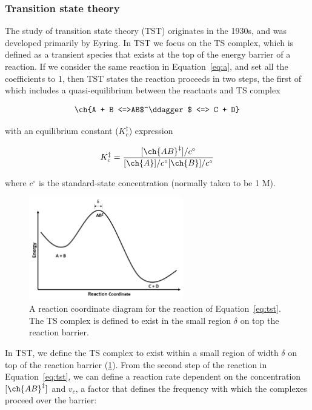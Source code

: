 \begin{doublespace}
\subsubsection{Transition state theory}

The study of transition state theory (TST) originates in the 1930s, and was
developed primarily by Eyring.\cite{McQuarrie1997,Steinfeld1998} In TST we
focus on the TS complex, which is defined as a transient species that exists
at the top of the energy barrier of a reaction. If we consider the same
reaction in Equation~\ref{eq:a}, and set all the coefficients to 1, then TST
states the reaction proceeds in two steps, the first of which includes a
quasi-equilibrium between the reactants and TS complex

\begin{equation}
  \ch{A + B <=>AB$^\ddagger$ <=> C + D}
  \label{eq:tst}
\end{equation}

\noindent with an equilibrium constant ($K_c^{\ddagger}$) expression

\begin{equation}
  K_c^{\ddagger} = \frac{[\ch{AB}^\ddagger]/c^\circ}{[\ch{A}]/c^\circ[\ch{B}]/c^\circ}
\label{eq:K}
\end{equation}

\noindent where $c^\circ$ is the standard-state concentration (normally taken to be
1 M).

\begin{figure}[htb]
    \centering
    \includegraphics[width=0.6\textwidth]{figures/TST-PES.png}
    \caption[A reaction coordinate diagram for a generic reaction.]{A reaction coordinate diagram for the reaction of Equation~\ref{eq:tst}. The TS complex is defined to exist in the small region $\delta$ on top the reaction barrier.}
\label{fig:tst-pes}
\end{figure}

In TST, we define the TS complex to exist within a small region of width
$\delta$ on top of the reaction barrier (\ref{fig:tst-pes}). From the second
step of the reaction in Equation~\ref{eq:tst}, we can define a reaction rate
dependent on the concentration $[\ch{AB}^\ddagger]$ and $v_c$, a factor that
defines the frequency with which the complexes proceed over the barrier:


\end{doublespace}
